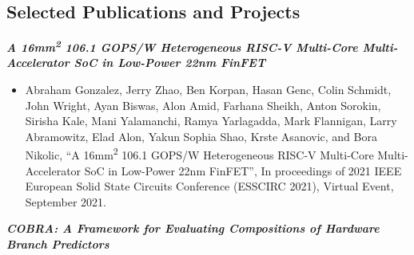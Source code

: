 \documentclass[letter]{res}
\begin{document}
\begin{resume}
\vspace{18mm}





\section{Selected Publications and Projects}

{\sl \textbf{A 16mm\textsuperscript{2} 106.1 GOPS/W Heterogeneous RISC-V Multi-Core Multi-Accelerator SoC in Low-Power 22nm FinFET}}\\

 \vspace{-4mm}

\begin{itemize}
 \item Abraham Gonzalez, Jerry Zhao, Ben Korpan, Hasan Genc, Colin Schmidt, John Wright, Ayan Biswas, Alon Amid, Farhana Sheikh, Anton Sorokin, Sirisha Kale, Mani Yalamanchi, Ramya Yarlagadda, Mark Flannigan, Larry Abramowitz, Elad Alon, Yakun Sophia Shao, Krste Asanovic, and Bora Nikolic, ``A 16mm\textsuperscript{2} 106.1 GOPS/W Heterogeneous RISC-V Multi-Core Multi-Accelerator SoC in Low-Power 22nm FinFET'', In proceedings of 2021 IEEE European Solid State Circuits Conference (ESSCIRC 2021), Virtual Event, September 2021.
\end{itemize}

\vspace{-2mm}

{\sl \textbf{COBRA: A Framework for Evaluating Compositions of Hardware Branch Predictors}}\\


\end{resume}
\end{document}
